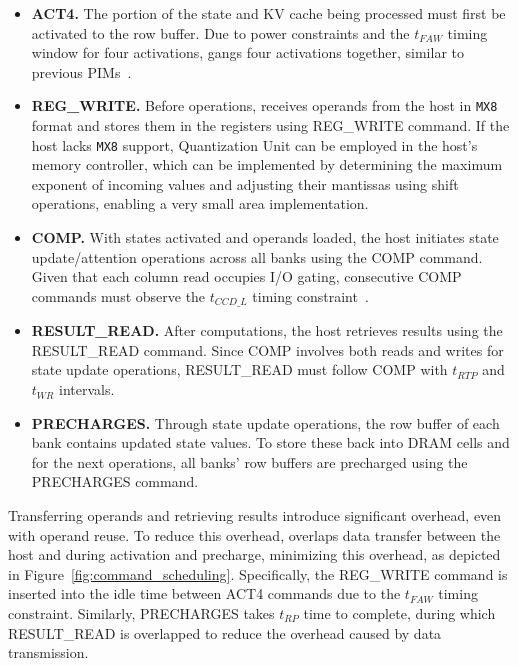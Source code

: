 %
\begin{itemize}[leftmargin=*]
  \item{\textbf{ACT4.}}
    The portion of the state and KV cache being processed must first
    be activated to the row buffer.
    Due to power constraints and the $t_{FAW}$ timing window for four
    activations, \sysname{} gangs four activations together, similar to
    previous PIMs~\cite{newton, heo2024neupims}.
  \item{\textbf{REG\_WRITE.}}
    Before operations, \sysname{} receives operands from the host in
    \texttt{MX8} format and stores them in the registers using
    REG\_WRITE command.
    If the host lacks \texttt{MX8} support, Quantization Unit can be
    employed in the host’s memory controller, which can be
    implemented by determining the maximum exponent of incoming
    values and adjusting their mantissas using shift operations,
    enabling a very small area implementation.
  \item{\textbf{COMP.}}
    With states activated and operands loaded, the host initiates
    state update/attention operations across all banks using the COMP command.
    Given that each column read occupies I/O gating, consecutive COMP
    commands must observe the $t_{CCD\_L}$ timing constraint~\cite{gradpim}.
  \item{\textbf{RESULT\_READ.}}
    After computations, the host retrieves results using the
    RESULT\_READ command.
    Since COMP involves both reads and writes for state update
    operations, RESULT\_READ must follow COMP with $t_{RTP}$ and
    $t_{WR}$ intervals.
  \item{\textbf{PRECHARGES.}}
    Through state update operations, the row buffer of each bank
    contains updated state values.
    To store these back into DRAM cells and for the next operations,
    all banks' row buffers are precharged using the PRECHARGES command.
\end{itemize}

%
%
Transferring operands and retrieving results introduce significant
overhead, even with operand reuse.
%
To reduce this overhead, \sysname{} overlaps data transfer between the
host and \sysname{} during activation and precharge, minimizing this
overhead, as depicted in Figure~\ref{fig:command_scheduling}.
%
Specifically, the REG\_WRITE command is inserted into the idle time
between ACT4 commands due to the $t_{FAW}$ timing constraint.
%
Similarly, PRECHARGES takes $t_{RP}$ time to complete, during which
RESULT\_READ is overlapped to reduce the overhead caused by data transmission.
%

